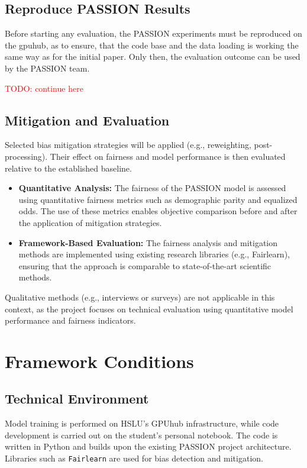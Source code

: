 \documentclass[12pt, a4paper, oneside]{book}   	%
\renewcommand{\todo}[1]{\textcolor{red}{TODO: #1}}
\begin{document}
		\subsection{Reproduce PASSION Results}
		Before starting any evaluation, the PASSION experiments must be reproduced on the \gls{gpuhub}, as to ensure, that the code base and the data loading is working the same way as for the initial paper. Only then, the evaluation outcome can be used by the PASSION team. 
		
		\todo{continue here}
		
		\subsection{Mitigation and Evaluation}
		Selected bias mitigation strategies will be applied (e.g., reweighting, post-processing). Their effect on fairness and model performance is then evaluated relative to the established baseline.
		
		\begin{itemize}
			\item \textbf{Quantitative Analysis:} The fairness of the PASSION model is assessed using quantitative fairness metrics such as demographic parity and equalized odds. The use of these metrics enables objective comparison before and after the application of mitigation strategies.
			\item \textbf{Framework-Based Evaluation:} The fairness analysis and mitigation methods are implemented using existing research libraries (e.g., Fairlearn), ensuring that the approach is comparable to state-of-the-art scientific methods.
		\end{itemize}
		
		Qualitative methods (e.g., interviews or surveys) are not applicable in this context, as the project focuses on technical evaluation using quantitative model performance and fairness indicators.
		
		
		\section{Framework Conditions}
		\subsection{Technical Environment}
		Model training is performed on HSLU's GPUhub infrastructure, while code development is carried out on the student’s personal notebook. The code is written in Python and builds upon the existing PASSION project architecture. Libraries such as \texttt{Fairlearn} are used for bias detection and mitigation.
		
\end{document}
